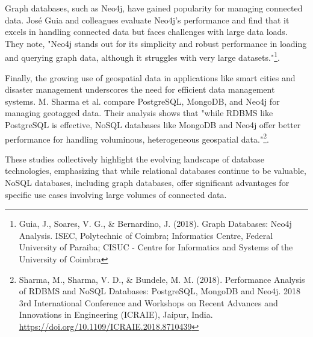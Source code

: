 Graph databases, such as Neo4j, have gained popularity for managing connected data. José Guia and colleagues evaluate Neo4j's performance and find that it excels in handling connected data but faces challenges with large data loads. They note, "Neo4j stands out for its simplicity and robust performance in loading and querying graph data, although it struggles with very large datasets."\footnote{Guia, J., Soares, V. G., \& Bernardino, J. (2018). Graph Databases: Neo4j Analysis. ISEC, Polytechnic of Coimbra; Informatics Centre, Federal University of Paraiba; CISUC - Centre for Informatics and Systems of the University of Coimbra}.

Finally, the growing use of geospatial data in applications like smart cities and disaster management underscores the need for efficient data management systems. M. Sharma et al. compare PostgreSQL, MongoDB, and Neo4j for managing geotagged data. Their analysis shows that "while RDBMS like PostgreSQL is effective, NoSQL databases like MongoDB and Neo4j offer better performance for handling voluminous, heterogeneous geospatial data."\footnote{Sharma, M., Sharma, V. D., \& Bundele, M. M. (2018). Performance Analysis of RDBMS and NoSQL Databases: PostgreSQL, MongoDB and Neo4j. 2018 3rd International Conference and Workshops on Recent Advances and Innovations in Engineering (ICRAIE), Jaipur, India. \protect\url{https://doi.org/10.1109/ICRAIE.2018.8710439}}.

These studies collectively highlight the evolving landscape of database technologies, emphasizing that while relational databases continue to be valuable, NoSQL databases, including graph databases, offer significant advantages for specific use cases involving large volumes of connected data.







